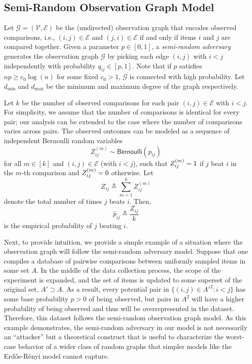 \documentclass[sigconf,nonacm,pbalance]{acmart}
\begin{document}
\subsection{Semi-Random Observation Graph Model}
Let $\mathcal{G}=(\mathcal{V}, \mathcal{E})$ be the (undirected) observation graph that encodes observed comparisons, i.e., $(i, j)\in \mathcal{E}$ and $(j, i)\in \mathcal{E}$ if and only if items $i$ and $j$ are compared together. Given a parameter $p \in [0, 1]$, a \emph{semi-random adversary} generates the observation graph $\mathcal{G}$ by picking each edge $(i, j)$ with $i<j$ independently with probability $q_{ij}\in[p, 1]$. Note that if $p$ satisfies $np \geq c_0 \log(n)$ for some fixed $c_0 >1$, $\mathcal{G}$ is connected with high probability.
Let $d_\text{min}$ and $d_\text{max}$ be the minimum and maximum degree of the graph respectively.

Let $k$ be the number of observed comparisons for each pair $(i, j) \in \mathcal{E}$ with $i<j$. For simplicity, we assume that the number of comparisons is identical for every pair; our analysis can be extended to the case where the number of comparisons varies across pairs. The observed outcomes can be modeled as a sequence of independent Bernoulli random variables
\begin{equation}
Z_{ij}^{(m)} \sim \mathsf{Bernoulli}(p_{ij})
\end{equation} for all $m \in [k]$ and $(i, j)\in\mathcal{E}$ (with $i<j$), such that $\smash{Z_{ij}^{(m)}}=1$ if $j$ beat $i$ in the $m$-th comparison and $\smash{Z_{ij}^{(m)}}=0$ otherwise. Let
\begin{equation}
Z_{ij} \triangleq \sum_{m=1}^k Z_{ij}^{(m)}
\end{equation}
denote the total number of times $j$ beats $i$. Then,
\begin{equation}\hat{p}_{ij} \triangleq \frac{Z_{ij}}{k}\end{equation}
is the empirical probability of $j$ beating $i$.

Next, to provide intuition, we provide a simple example of a situation where the observation graph will follow the semi-random adversary model. Suppose that one compiles a database of pairwise comparisons between uniformly sampled items in some set $A$. In the middle of the data collection process, the scope of the experiment is expanded, and the set of items is updated to some superset of the original set, $A'\supset A$. As a result, every potential pair in $\{(i,j)\in {A'}^2: i<j\}$ has some base probability $p>0$ of being observed, but pairs in $A^2$ will have a higher probability of being observed and thus will be overrepresented in the dataset. Therefore, this dataset follows the semi-random observation graph model. As this example demonstrates, the semi-random adversary in our model is not necessarily an ``attacker'' but a theoretical construct that is useful to characterize the worst-case behavior of a wider class of random graphs that simpler models like the Erd\H{o}s-R\'{e}nyi model cannot capture.
\end{document}
